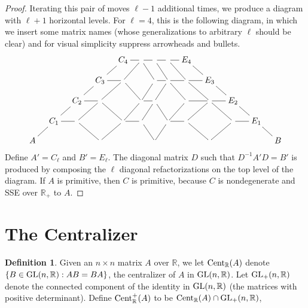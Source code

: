 \documentclass{amsart}
\theoremstyle{definition}
\newtheorem{definition}[theorem]{Definition}
\theoremstyle{remark}
\numberwithin{equation}{section}
\begin{document}
{{\begin{proof}
Iterating this pair of moves  $\ell -1$ additional times, 
we produce a diagram with $\ell +1$ horizontal levels.  
 For $\ell =4$, this is the following diagram, in which
 we insert some matrix 
names (whose generalizations to arbitrary $\ell$
should be clear) and 
for visual 
simplicity  suppress arrowheads and bullets.  
\begin{equation}
\xymatrix@=10pt{
&&&& C_4\ar@{-}[dl]\ar@{-}[r] & \ar@{-}[dl]\ar@{-}[dr] \ar@{-}[r]  &\ar@{-}[r]\ar@{-}[dr]   &  \ar@{-}[dr]\ar@{-}[r]  &  
E_4\ar@{-}[dr] &&  &  &  \\
&&&  C_3\ar@{-}[dl]\ar@{-}[r] & \ar@{-}[dl]\ar@{-}[dr] & & \ar@{-}[dl]\ar@{-}[r]  &\ar@{-}[dl]\ar@{-}[dr] \ar@{-}[r]       &  \ar@{-}[dr]\ar@{-}[r] &
E_3\ar@{-}[dr] &&      \\
&&  C_2\ar@{-}[dl]\ar@{-}[r] & \ar@{-}[dl]\ar@{-}[dr] & & \ar@{-}[dl]\ar@{-}[r]  &\ar@{-}[dl]\ar@{-}[dr]     &  &  \ar@{-}[dl]\ar@{-}[r] 
 &\ar@{-}[dl]\ar@{-}[dr] \ar@{-}[r]    &E_2\ar@{-}[dr]  &  &      \\
    & C_1 \ar@{-}[r]\ar@{-}[dl] &  \ar@{-}[dr] &    &  \ar@{-}[r]\ar@{-}[dl] &  \ar@{-}[dr] &    &  \ar@{-}[r]\ar@{-}[dl] &  \ar@{-}[dr] & 
  &  \ar@{-}[r]\ar@{-}[dl] & E_1 \ar@{-}[dr] &      \\
A &                 &           & &                 &           &  &                 &       
   & &                 &           & B                                         
}
\end{equation}
Define $A'=C_{\ell}$ and $B'=E_{\ell}$.
The diagonal matrix $D$ such that $D^{-1}A'D=B'$ is produced by composing 
the $\ell$ diagonal refactorizations on the top level of the diagram. 
 If $A$ is primitive, then $C$ is primitive, because $C$ is nondegenerate 
and SSE over $\mathbb R_+$ to $A$. 
\end{proof} 

\section{The Centralizer} \label{centralizersec}
        
\begin{definition} Given 
an $n\times n$ matrix $A$ over $\mathbb R$,  we let 
${\textnormal{Cent}_{\mathbb R}(A)}$ denote $\{B\in \textnormal{GL}(n,\mathbb R): AB=BA\}$, the centralizer 
of $A$ in $\textnormal{GL}(n,\mathbb R)$. 
 Let $\textnormal{GL}_+(n, \mathbb R)$ denote the connected component of the 
identity in $\textnormal{GL}(n, \mathbb R)$ (the matrices with positive determinant). 
Define
${\textnormal{Cent}^+_{\mathbb R}(A)} $ to be ${\textnormal{Cent}_{\mathbb R}(A)} \cap \textnormal{GL}_+(n, \mathbb R)$,
\end{definition} 

}}
\end{document}
